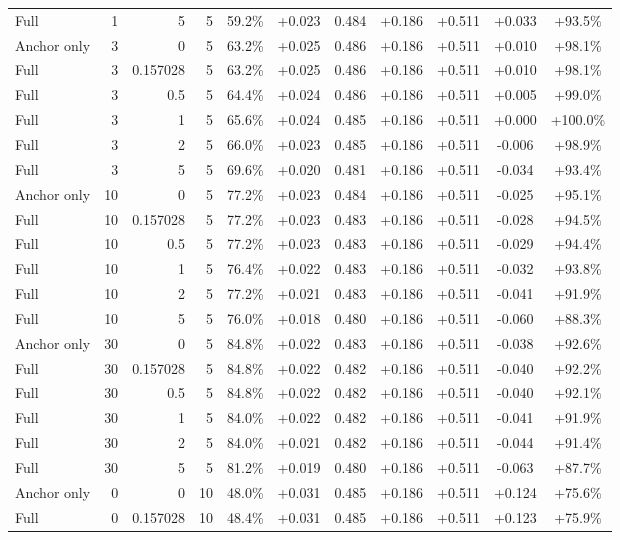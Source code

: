 \begin{table}[htbp]
\begin{tabular}{lrrrccccccc}
Full & 1 & 5 & 5 & 59.2\% & +0.023 & 0.484 & +0.186 & +0.511 & +0.033 & +93.5\% \\
Anchor only & 3 & 0 & 5 & 63.2\% & +0.025 & 0.486 & +0.186 & +0.511 & +0.010 & +98.1\% \\
Full & 3 & 0.157028 & 5 & 63.2\% & +0.025 & 0.486 & +0.186 & +0.511 & +0.010 & +98.1\% \\
Full & 3 & 0.5 & 5 & 64.4\% & +0.024 & 0.486 & +0.186 & +0.511 & +0.005 & +99.0\% \\
Full & 3 & 1 & 5 & 65.6\% & +0.024 & 0.485 & +0.186 & +0.511 & +0.000 & +100.0\% \\
Full & 3 & 2 & 5 & 66.0\% & +0.023 & 0.485 & +0.186 & +0.511 & -0.006 & +98.9\% \\
Full & 3 & 5 & 5 & 69.6\% & +0.020 & 0.481 & +0.186 & +0.511 & -0.034 & +93.4\% \\
Anchor only & 10 & 0 & 5 & 77.2\% & +0.023 & 0.484 & +0.186 & +0.511 & -0.025 & +95.1\% \\
Full & 10 & 0.157028 & 5 & 77.2\% & +0.023 & 0.483 & +0.186 & +0.511 & -0.028 & +94.5\% \\
Full & 10 & 0.5 & 5 & 77.2\% & +0.023 & 0.483 & +0.186 & +0.511 & -0.029 & +94.4\% \\
Full & 10 & 1 & 5 & 76.4\% & +0.022 & 0.483 & +0.186 & +0.511 & -0.032 & +93.8\% \\
Full & 10 & 2 & 5 & 77.2\% & +0.021 & 0.483 & +0.186 & +0.511 & -0.041 & +91.9\% \\
Full & 10 & 5 & 5 & 76.0\% & +0.018 & 0.480 & +0.186 & +0.511 & -0.060 & +88.3\% \\
Anchor only & 30 & 0 & 5 & 84.8\% & +0.022 & 0.483 & +0.186 & +0.511 & -0.038 & +92.6\% \\
Full & 30 & 0.157028 & 5 & 84.8\% & +0.022 & 0.482 & +0.186 & +0.511 & -0.040 & +92.2\% \\
Full & 30 & 0.5 & 5 & 84.8\% & +0.022 & 0.482 & +0.186 & +0.511 & -0.040 & +92.1\% \\
Full & 30 & 1 & 5 & 84.0\% & +0.022 & 0.482 & +0.186 & +0.511 & -0.041 & +91.9\% \\
Full & 30 & 2 & 5 & 84.0\% & +0.021 & 0.482 & +0.186 & +0.511 & -0.044 & +91.4\% \\
Full & 30 & 5 & 5 & 81.2\% & +0.019 & 0.480 & +0.186 & +0.511 & -0.063 & +87.7\% \\
Anchor only & 0 & 0 & 10 & 48.0\% & +0.031 & 0.485 & +0.186 & +0.511 & +0.124 & +75.6\% \\
Full & 0 & 0.157028 & 10 & 48.4\% & +0.031 & 0.485 & +0.186 & +0.511 & +0.123 & +75.9\% \\

\end{tabular}
\end{table}
